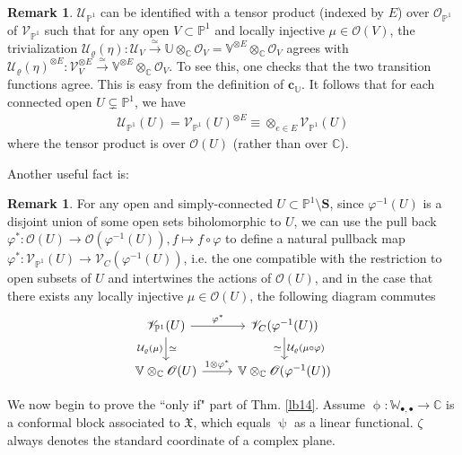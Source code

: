 \documentclass[11pt,b5paper,notitlepage]{article}
\theoremstyle{definition}
\newtheorem{rem}[df]{Remark}
\theoremstyle{plain}
\newcommand{\fk}{\mathfrak}
\newcommand{\mc}{\mathcal}
\newcommand{\scr}{\mathscr}
\newcommand{\blt}{\bullet}
\newcommand{\Vbb}{\mathbb V}
\newcommand{\Ubb}{\mathbb U}
\newcommand{\Wbb}{\mathbb W}
\newcommand{\Cbb}{\mathbb C}
\newcommand{\Pbb}{\mathbb P}
\newcommand{\cbf}{\mathbf c}
\newcommand{\Sbf}{\mathbf{S}}
\numberwithin{equation}{subsection}
\begin{document}
\begin{rem}\label{lb15}
$\scr U_{\Pbb^1}$ can be identified with a tensor product (indexed by $E$) over $\scr O_{\Pbb^1}$ of $\scr V_{\Pbb^1}$ such that for any open $V\subset\Pbb^1$ and locally injective $\mu\in\scr O(V)$, the trivialization $\mc U_\varrho(\eta):\scr U_V\xrightarrow{\simeq}\Ubb\otimes_\Cbb\scr O_V=\Vbb^{\otimes E}\otimes_\Cbb\scr O_V$ agrees with $\mc U_\varrho(\eta)^{\otimes E}:\scr V_V^{\otimes E}\xrightarrow{\simeq}\Vbb^{\otimes E}\otimes_\Cbb\scr O_V$. To see this, one checks that the two transition functions agree. This is easy from the definition of $\cbf_\Ubb$. It follows that for each connected open $U\subsetneq\Pbb^1$, we have
\begin{align}
\scr U_{\Pbb^1}(U)=\scr V_{\Pbb^1}(U)^{\otimes E}\equiv\otimes_{e\in E}\scr V_{\Pbb^1}(U)\label{eq41}
\end{align}
where the tensor product is over $\scr O(U)$ (rather than over $\Cbb$).
\end{rem}

Another useful fact is:

\begin{rem}\label{lb16}
For any open and simply-connected $U\subset\Pbb^1\setminus\Sbf$, since $\varphi^{-1}(U)$ is a disjoint union of some open sets biholomorphic to $U$, we can use the pull back $\varphi^*:\scr O(U)\rightarrow\scr O(\varphi^{-1}(U)),f\mapsto f\circ\varphi$ to define a natural pullback map $\varphi^*:\scr V_{\Pbb^1}(U)\rightarrow\scr V_C(\varphi^{-1}(U))$, i.e. the one compatible with the restriction to open subsets of $U$ and intertwines the actions of $\scr O(U)$, and in the case that there exists any locally injective $\mu\in\scr O(U)$, the following diagram commutes
\begin{equation}\label{eq36}
	\begin{tikzcd}
		\scr V_{\Pbb^1}(U) \arrow[r, "\varphi^*"] \arrow[d,"\mc U_\varrho(\mu)"', "\simeq"] &\scr V_C(\varphi^{-1}(U)) \arrow[d, "\mc U_\varrho(\mu\circ\varphi)", "\simeq"']\\
		\Vbb\otimes_\Cbb\scr O(U)\arrow[r,"1\otimes\varphi^*"] &\Vbb\otimes_\Cbb\scr O(\varphi^{-1}(U))
	\end{tikzcd}	
\end{equation} 
\end{rem}








We now begin to prove the ``only if" part of Thm. \ref{lb14}. Assume $\upphi:\Wbb_{\blt,\blt}\rightarrow\Cbb$ is a conformal block associated to $\fk X$, which equals $\uppsi$ as a linear functional. $\zeta$ always denotes the standard coordinate of a complex plane.
 
\end{document}

